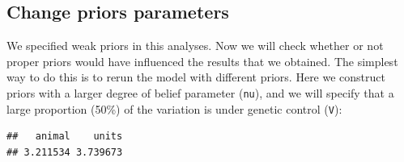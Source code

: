 \documentclass[
  12pt,
]{book}
\newenvironment{Shaded}{\begin{snugshade}}{\end{snugshade}}
\newcommand{\AttributeTok}[1]{\textcolor[rgb]{0.77,0.63,0.00}{#1}}
\newcommand{\ConstantTok}[1]{\textcolor[rgb]{0.00,0.00,0.00}{#1}}
\newcommand{\DecValTok}[1]{\textcolor[rgb]{0.00,0.00,0.81}{#1}}
\newcommand{\FloatTok}[1]{\textcolor[rgb]{0.00,0.00,0.81}{#1}}
\newcommand{\FunctionTok}[1]{\textcolor[rgb]{0.00,0.00,0.00}{#1}}
\newcommand{\NormalTok}[1]{#1}
\newcommand{\OtherTok}[1]{\textcolor[rgb]{0.56,0.35,0.01}{#1}}
\newcommand{\SpecialCharTok}[1]{\textcolor[rgb]{0.00,0.00,0.00}{#1}}
\begin{document}
\hypertarget{change-priors-parameters}{%
\subsection{Change priors parameters}\label{change-priors-parameters}}

We specified weak priors in this analyses. Now we will check whether or not proper priors would have influenced the results that we obtained. The simplest way to do this is to rerun the model with different priors. Here we construct priors with a larger degree of belief parameter (\texttt{nu}), and we will specify that a large proportion (50\%) of the variation is under genetic control (\texttt{V}):

\begin{Shaded}
\end{Shaded}

\begin{verbatim}
##   animal    units 
## 3.211534 3.739673
\end{verbatim}
\end{document}
